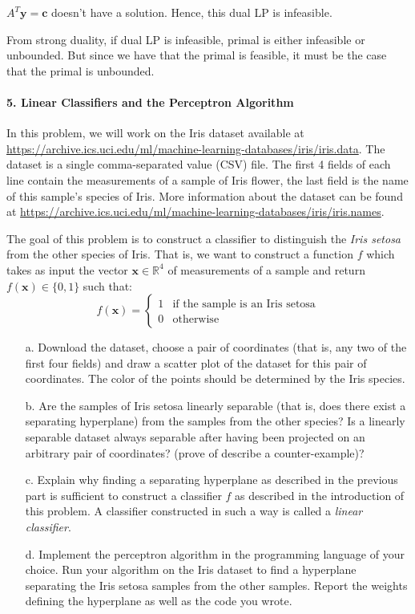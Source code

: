 \documentclass[11pt]{article}
\newcommand{\bx}{\mathbf{x}}
\newcommand{\by}{\mathbf{y}}
\begin{document}
$A^T \by = \textbf{c}$ doesn't have a solution. Hence, this dual LP is infeasible.

From strong duality, if dual LP is infeasible, primal is either infeasible or unbounded. But since we have that the primal is feasible, it must be the case that the primal is unbounded.
\color{black}

\paragraph{5. Linear Classifiers and the Perceptron Algorithm}

In this problem, we will work on the Iris dataset available at
\url{https://archive.ics.uci.edu/ml/machine-learning-databases/iris/iris.data}.
The dataset is a single comma-separated value (CSV) file. The first 4 fields of
each line contain the measurements of a sample of Iris flower, the
last field is the name of this sample's species of Iris. More information about
the dataset can be found at
\url{https://archive.ics.uci.edu/ml/machine-learning-databases/iris/iris.names}.

The goal of this problem is to construct a classifier to distinguish the
\emph{Iris setosa} from the other species of Iris. That is, we want to construct
a function $f$ which takes as input the vector $\bx\in\mathbb{R}^4$ of
measurements of a sample and return $f(\bx)\in\{0,1\}$ such that:
\begin{displaymath}
    f(\bx) = \begin{cases}
        1& \text{if the sample is an Iris setosa}\\
        0& \text{otherwise}
    \end{cases}
\end{displaymath}

\begin{itemize}
    \item[a.] Download the dataset, choose a pair of coordinates (that is, any
        two of the first four fields) and draw a scatter plot of the dataset
        for this pair of coordinates. The color of the points should be
        determined by the Iris species.
    \item[b.] Are the samples of Iris setosa linearly separable (that is, does
        there exist a separating hyperplane) from the samples from the other
        species? Is a linearly separable dataset always separable after having
        been projected on an arbitrary pair of coordinates? (prove of describe
        a counter-example)?
    \item[c.] Explain why finding a separating hyperplane as described in the
        previous part is sufficient to construct a classifier $f$ as
        described in the introduction of this problem. A classifier constructed
        in such a way is called a \emph{linear classifier}.
    \item[d.] Implement the perceptron algorithm in the programming language of
        your choice. Run your algorithm on the Iris dataset to find
        a hyperplane separating the Iris setosa samples from the other samples.
        Report the weights defining the hyperplane as well as the code you
        wrote.
\end{itemize}
\end{document}
